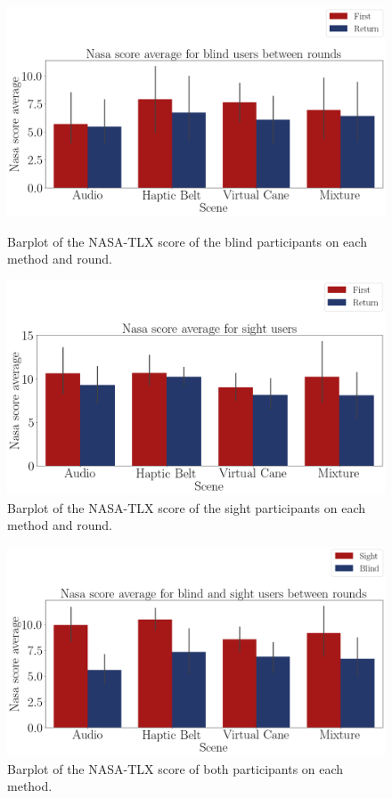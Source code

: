\begin{figure}[!htb]
    \centering
    \begin{minipage}{\textwidth}
        \centering
        \includegraphics[width = 0.8\linewidth]{Resultados/Nasa/Figuras/png/barplot_nasa_avg_4_scene_blind.png}
        \caption{Barplot of the NASA-TLX score of the blind participants on each method and round.}
        \label{fig:barplot_nasa_avg_4_scene_blind}
    \end{minipage}
    \begin{minipage}{\textwidth}
        \centering
        \includegraphics[width = 0.8\linewidth]{Resultados/Nasa/Figuras/png/barplot_nasa_avg_4_scene_sight.png}
        \caption{Barplot of the NASA-TLX score of the sight participants on each method and round.}
        \label{fig:barplot_nasa_avg_4_scene_sight}
    \end{minipage}
\end{figure}
\begin{figure}[!htb]
    \centering
    \includegraphics[width = 0.8\linewidth]{Resultados/Nasa/Figuras/png/barplot_nasa_avg_4_scene.png}
    \caption{Barplot of the NASA-TLX score of both participants on each method.}
    \label{fig:barplot_nasa_avg_4_scene}
\end{figure}


